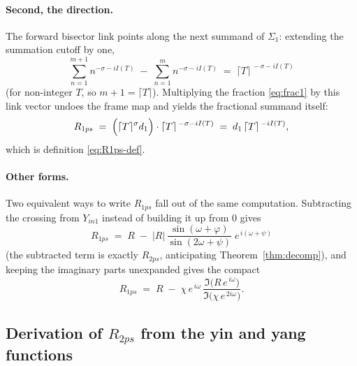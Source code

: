 \documentclass[11pt]{article}
\theoremstyle{definition}
\begin{document}
\paragraph{Second, the direction.} The forward bisector link points along the
next summand of $\Sigma_1$: extending the summation cutoff by one,
\begin{equation}\label{eq:sigma1diff}
\sum_{n=1}^{m+1} n^{-\sigma-iI(T)}
\;-\;
\sum_{n=1}^{m} n^{-\sigma-iI(T)}
\;=\;
\lceil T\rceil^{\,-\sigma-iI(T)}
\end{equation}
(for non-integer $T$, so $m+1=\lceil T\rceil$). Multiplying the fraction
\eqref{eq:frac1} by this link vector undoes the frame map and yields the
fractional summand itself:
\begin{equation}\label{eq:R1-derived}
R_{1ps}
\;=\;
\Bigl(\lceil T\rceil^{\sigma} d_1\Bigr)\cdot\lceil T\rceil^{\,-\sigma-iI(T)}
\;=\;
d_1\,\lceil T\rceil^{\,-iI(T)},
\end{equation}
which is definition \eqref{eq:R1ps-def}.

\paragraph{Other forms.} Two equivalent ways to write $R_{1ps}$ fall out of
the same computation. Subtracting the crossing from $Y_{in1}$ instead of
building it up from $0$ gives
\begin{equation}\label{eq:R1-other-a}
R_{1ps}
\;=\;
R
\;-\;
|R|\,\frac{\sin(\omega+\varphi)}{\sin(2\omega+\psi)}\;
e^{\,i(\omega+\psi)}
\end{equation}
(the subtracted term is exactly $R_{2ps}$, anticipating
Theorem~\ref{thm:decomp}), and keeping the imaginary parts unexpanded gives
the compact
\begin{equation}\label{eq:R1-other-b}
R_{1ps}
\;=\;
R
\;-\;
\chi\,e^{\,i\omega}\,
\frac{\Im\!\bigl(R\,e^{\,i\omega}\bigr)}
     {\Im\!\bigl(\chi\,e^{\,2i\omega}\bigr)} .
\end{equation}

\subsection{Derivation of \texorpdfstring{$R_{2ps}$}{R2ps} from the yin and yang functions}\label{sec:derive-r2ps}
\end{document}
